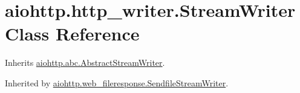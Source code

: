 \hypertarget{classaiohttp_1_1http__writer_1_1_stream_writer}{}\section{aiohttp.\+http\+\_\+writer.\+Stream\+Writer Class Reference}
\label{classaiohttp_1_1http__writer_1_1_stream_writer}


Inherits \hyperlink{classaiohttp_1_1abc_1_1_abstract_stream_writer}{aiohttp.\+abc.\+Abstract\+Stream\+Writer}.



Inherited by \hyperlink{classaiohttp_1_1web__fileresponse_1_1_sendfile_stream_writer}{aiohttp.\+web\+\_\+fileresponse.\+Sendfile\+Stream\+Writer}.

